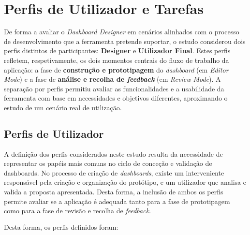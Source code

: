 \section{Perfis de Utilizador e Tarefas}
\label{sec:cap5_profiles_tasks}

De forma a avaliar o \textit{Dashboard Designer} em cenários alinhados com o processo de desenvolvimento que a ferramenta pretende suportar, o estudo considerou dois perfis distintos de participantes: \textbf{Designer} e \textbf{Utilizador Final}. Estes perfis refletem, respetivamente, os dois momentos centrais do fluxo de trabalho da aplicação: a fase de \textbf{construção e prototipagem} do \textit{dashboard} (em \textit{Editor Mode}) e a fase de \textbf{análise e recolha de \textit{feedback}} (em \textit{Review Mode}). A separação por perfis permitiu avaliar as funcionalidades e a usabilidade da ferramenta com base em necessidades e objetivos diferentes, aproximando o estudo de um cenário real de utilização.

\subsection{Perfis de Utilizador}
\label{subsec:cap5_profiles}

A definição dos perfis considerados neste estudo resulta da necessidade de representar os papéis mais comuns no ciclo de conceção e validação de dashboards. No processo de criação de \textit{dashboards}, existe um interveniente responsável pela criação e organização do protótipo, e um utilizador que analisa e valida a proposta apresentada. Desta forma, a inclusão de ambos os perfis permite avaliar se a aplicação é adequada tanto para a fase de prototipagem como para a fase de revisão e recolha de \textit{feedback}.

Desta forma, os perfis definidos foram:


